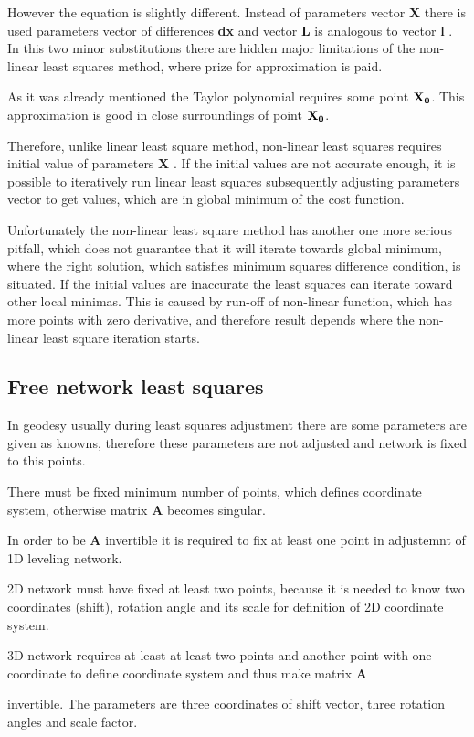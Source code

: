 \documentclass[a4paper,12pt]{report}
\newcommand{\ematr}[1]{
{\bf #1}
}
\newcommand{\evect}[1]{
{\bf #1}
}
\begin{document}
However the equation is slightly different. Instead of parameters vector \evect{X} there is used 
parameters vector of differences \evect{dx} and vector \evect{L} is analogous to vector \evect{l}. In this two minor 
substitutions there are hidden major limitations of the non-linear least squares method, 
where prize for approximation is paid. 

As it was already mentioned the Taylor polynomial requires some point $\evect{X_{0}}$.
This approximation is good in close surroundings of point $\evect{X_{0}}$.

Therefore, unlike linear least square method, non-linear least squares requires initial 
value of parameters \evect{X}. If the initial values are not accurate 
enough, it is possible to iteratively run linear least squares subsequently adjusting parameters vector 
to get values, which are in global minimum of the cost function. 

Unfortunately the non-linear least square method has another one more serious pitfall, which 
does not guarantee that it will iterate towards global minimum, where the right solution,
which satisfies minimum squares difference condition,  is situated. If the initial values are 
inaccurate the least squares can iterate toward other local minimas.  
This is caused by run-off of non-linear function, which has more points with zero derivative,
and therefore result depends where the non-linear least square iteration starts.


\subsection{Free network least squares}
\label{sec:free_net_least}

In geodesy usually during least squares adjustment there are some parameters are given as knowns, 
therefore these parameters are not adjusted and network is fixed to this points. 

There must be fixed minimum number of points, which defines coordinate system, otherwise 
matrix \ematr{A} becomes singular. 


In order to be \ematr{A} invertible it is required to fix at least one point in adjustemnt of 1D leveling network.

2D network must have fixed at least two points, because it is needed  
to know two coordinates (shift), rotation angle and its scale for definition of 2D coordinate system. 

3D network requires at least at least 
two points and another point with one coordinate to define coordinate system and thus make matrix \ematr{A}
invertible. The parameters are three coordinates of shift vector, three rotation angles and scale factor. 
\end{document}
